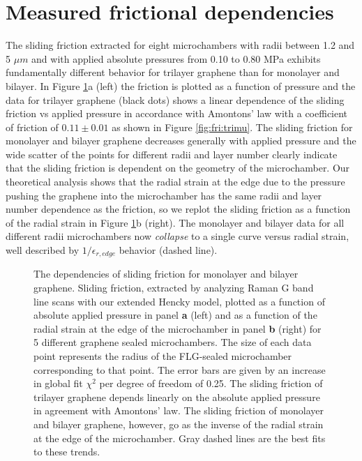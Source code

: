 \section{Measured frictional dependencies}
The sliding friction extracted for eight microchambers with radii between 1.2 and 5 $\mu m$ and with applied absolute pressures from 0.10 to 0.80 MPa exhibits fundamentally different behavior for trilayer graphene than for monolayer and bilayer.
In Figure \ref{fig:fri:FvsP}a (left) the friction is plotted as a function of pressure and the data for trilayer graphene (black dots) shows a linear dependence of the sliding friction vs applied pressure in accordance with Amontons' law with a coefficient of friction of $0.11 \pm 0.01$ as shown in Figure \ref{fig:fri:trimu}.
The sliding friction for monolayer and bilayer graphene decreases generally with applied pressure and the wide scatter of the points for different radii and layer number clearly indicate that the sliding friction is dependent on the geometry of the microchamber.
Our theoretical analysis shows that the radial strain at the edge due to the pressure pushing the graphene into the microchamber has the same radii and layer number dependence as the friction, so we replot the sliding friction as a function of the radial strain in Figure \ref{fig:fri:FvsP}b (right).
The monolayer and bilayer data for all different radii microchambers now \emph{collapse} to a single curve versus radial strain, well described by $1/\epsilon_{r,edge}$ behavior (dashed line). 

\begin{figure}
	\begin{center}
	
	\end{center}
	\caption[The dependencies of sliding friction for monolayer and bilayer graphene]{\label{fig:fri:FvsP}  The dependencies of sliding friction for monolayer and bilayer graphene. Sliding friction, extracted by analyzing Raman G band line scans with our extended Hencky model, plotted as a function of absolute applied pressure in panel \textbf{a} (left) and as a function of the radial strain at the edge of the microchamber in panel \textbf{b} (right) for 5 different graphene sealed microchambers.  The size of each data point represents the radius of the FLG-sealed microchamber corresponding to that point. The error bars are given by an increase in global fit $\chi^2$ per degree of freedom of 0.25.  The sliding friction of trilayer graphene depends linearly on the absolute applied pressure in agreement with Amontons' law. The sliding friction of monolayer and bilayer graphene, however, go as the inverse of the radial strain at the edge of the microchamber.  Gray dashed lines are the best fits to these trends.}
\end{figure}


